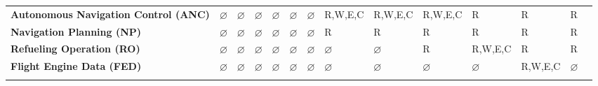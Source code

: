 \documentclass[10pt,journal,compsoc]{IEEEtran}
\begin{document}
\begin{table*}[]
{\begin{tabular}{llllllllllllll}
    \multicolumn{1}{l|}{\textbf{Autonomous Navigation Control (ANC)}}     & $\varnothing$ & $\varnothing$ & $\varnothing$ & $\varnothing$ & $\varnothing$ & $\varnothing$ & R,W,E,C       & R,W,E,C       & R,W,E,C       & R             & R             & R             \\
    \multicolumn{1}{l|}{\textbf{Navigation Planning (NP)}}                & $\varnothing$ & $\varnothing$ & $\varnothing$ & $\varnothing$ & $\varnothing$ & $\varnothing$ & R             & R             & R             & R             & R             & R             \\
    \multicolumn{1}{l|}{\textbf{Refueling Operation (RO)}}                & $\varnothing$ & $\varnothing$ & $\varnothing$ & $\varnothing$ & $\varnothing$ & $\varnothing$ & $\varnothing$ & $\varnothing$ & R             & R,W,E,C       & R             & R             \\
    \multicolumn{1}{l|}{\textbf{Flight Engine Data (FED)}}                & $\varnothing$ & $\varnothing$ & $\varnothing$ & $\varnothing$ & $\varnothing$ & $\varnothing$ & $\varnothing$ & $\varnothing$ & $\varnothing$ & $\varnothing$ & R,W,E,C       & $\varnothing$ \\
                                                                          &               &               &               &               &               &               &               &               &               &               &               &              
  \end{tabular}}
  \end{table*}
\end{document}
